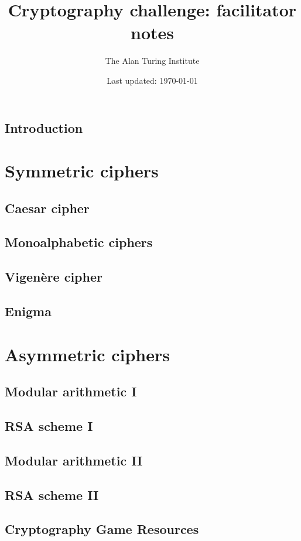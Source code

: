 \documentclass[12pt]{article}
\begin{document}
\title{Cryptography challenge: facilitator notes}
\author{The Alan Turing Institute}
\date{Last updated: \today}
\maketitle

\subsection{Introduction}

\pagebreak
\section*{Symmetric ciphers}

\subsection{Caesar cipher}

\subsection{Monoalphabetic ciphers}

\subsection{Vigen{\`e}re cipher}

\subsection{Enigma}

\pagebreak
\section*{Asymmetric ciphers}

\subsection{Modular arithmetic I}

\subsection{RSA scheme I}

\subsection{Modular arithmetic II}

\subsection{RSA scheme II}

\pagebreak

\subsection{Cryptography Game Resources}
\end{document}
